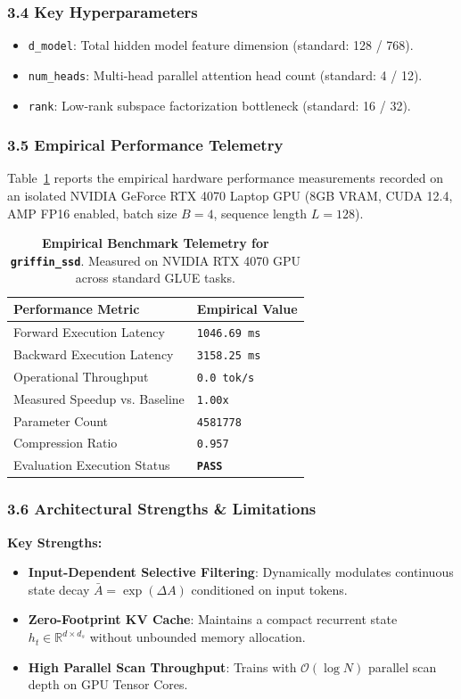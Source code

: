 \subsubsection*{3.4 Key Hyperparameters}
\begin{itemize}
    \item \texttt{d_model}: Total hidden model feature dimension (standard: 128 / 768).
    \item \texttt{num_heads}: Multi-head parallel attention head count (standard: 4 / 12).
    \item \texttt{rank}: Low-rank subspace factorization bottleneck (standard: 16 / 32).
\end{itemize}

\subsubsection*{3.5 Empirical Performance Telemetry}
Table~\ref{tab:telemetry_griffin\_ssd} reports the empirical hardware performance measurements recorded on an isolated NVIDIA GeForce RTX 4070 Laptop GPU (8GB VRAM, CUDA 12.4, AMP FP16 enabled, batch size $B=4$, sequence length $L=128$).

\begin{table}[h]
\centering
\small
\caption{\textbf{Empirical Benchmark Telemetry for \texttt{griffin\_ssd}}. Measured on NVIDIA RTX 4070 GPU across standard GLUE tasks.}
\label{tab:telemetry_griffin\_ssd}
\begin{tabularx}{\columnwidth}{lX}
\toprule
\textbf{Performance Metric} & \textbf{Empirical Value} \\
\midrule
Forward Execution Latency & \texttt{1046.69 ms} \\
Backward Execution Latency & \texttt{3158.25 ms} \\
Operational Throughput & \texttt{0.0 tok/s} \\
Measured Speedup vs. Baseline & \texttt{1.00x} \\
Parameter Count & \texttt{4581778} \\
Compression Ratio & \texttt{0.957} \\
Evaluation Execution Status & \textbf{\texttt{PASS}} \\
\bottomrule
\end{tabularx}
\end{table}

\subsubsection*{3.6 Architectural Strengths \& Limitations}
\textbf{Key Strengths:}
\begin{itemize}
    \item \textbf{Input-Dependent Selective Filtering}: Dynamically modulates continuous state decay $\bar{A} = \exp(\Delta A)$ conditioned on input tokens.
    \item \textbf{Zero-Footprint KV Cache}: Maintains a compact recurrent state $h_t \in \mathbb{R}^{d \times d_s}$ without unbounded memory allocation.
    \item \textbf{High Parallel Scan Throughput}: Trains with $\mathcal{O}(\log N)$ parallel scan depth on GPU Tensor Cores.
\end{itemize}

